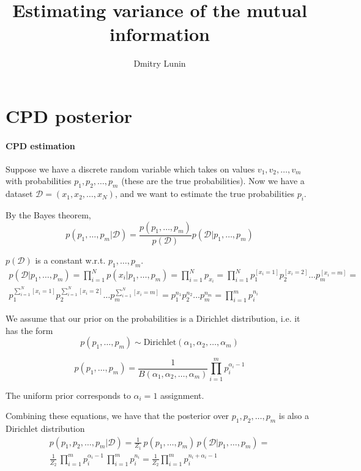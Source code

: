 \documentclass{article}
\author{Dmitry Lunin}
\title{Estimating variance of the mutual information}
\begin{document}
	\maketitle

\section{CPD posterior}
\paragraph{CPD estimation} Suppose we have a discrete random variable which takes on values $v_1, v_2, \ldots, v_m$ with probabilities $p_1, p_2, \ldots, p_m$ (these are the true probabilities). Now we have a dataset $\mathcal{D} = (x_1, x_2, \ldots, x_N)$, and we want to estimate the true probabilities $p_i$.

By the Bayes theorem,
\begin{equation}
p(p_1, \ldots, p_m | \mathcal{D}) = \frac{p(p_1, \ldots, p_m)}{p(\mathcal{D})} p(\mathcal{D} | p_1, \ldots, p_m) 
\end{equation}

$p(\mathcal{D})$ is a constant w.r.t. $p_1, \ldots, p_m$.
\begin{multline}
p(\mathcal{D}|p_1, \ldots, p_m) = \prod_{i=1}^{N}{p(x_i|p_1, \ldots, p_m)} = \prod_{i=1}^{N}{p_{x_i}} = \prod_{i=1}^{N}{p_1^{[x_i = 1]} p_2^{[x_i = 2]} \ldots p_m^{[x_i = m]}} = \\ p_1^{\sum_{i=1}^N{[x_i = 1]}} p_2^{\sum_{i=1}^N{[x_i = 2]}} \ldots p_m^{\sum_{i=1}^N{[x_i = m]}} = p_1^{n_1} p_2^{n_2} \ldots p_m^{n_m} = \prod_{i = 1}^m{p_i^{n_i}}
\end{multline}

We assume that our prior on the probabilities is a Dirichlet distribution, i.e. it has the form 
\begin{equation*}
p(p_1, \ldots, p_m) \sim \textrm{Dirichlet}(\alpha_1, \alpha_2, \ldots, \alpha_m)
\end{equation*}

\begin{equation}
p(p_1, \ldots, p_m) = \frac{1}{B(\alpha_1, \alpha_2, \ldots, \alpha_m)} \prod_{i=1}^m{p_i^{\alpha_i - 1}}
\end{equation}

The uniform prior corresponds to $\alpha_i = 1$ assignment.

Combining these equations, we have that the posterior over $p_1, p_2, \ldots, p_m$ is also a Dirichlet distribution
\begin{multline}
p(p_1, p_2, \ldots, p_m|\mathcal{D}) = \frac{1}{Z_1}\,p(p_1, \ldots, p_m)\,p(\mathcal{D}|p_1, \ldots, p_m) = \\ \frac{1}{Z_2} \, \prod_{i=1}^m{p_i^{\alpha_i - 1}} \, \prod_{i=1}^m{p_i^{n_i}} = \frac{1}{Z_2}{ \prod_{i=1}^m{p_i^{n_i + \alpha_i - 1}}}
\end{multline}
\end{document}
